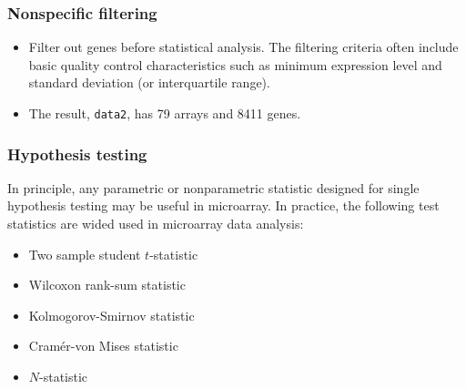 \begin{frame}[fragile]
  \frametitle{Nonspecific filtering}
  \begin{itemize}
  \item Filter out genes \alert{before} statistical analysis.  The
    filtering criteria often include basic quality control
    characteristics such as minimum expression level and standard
    deviation (or interquartile range).
\begin{knitrout}\footnotesize
{}\color{fgcolor}\begin{kframe}
\begin{alltt}
 \hlkwb{<-} \hlstd{(}\hlopt{>=}

 \hlkwb{<-} \hlstd{(}\hlopt{>=}
 \hlkwb{<-} \hlstd{data1[filter1} \hlopt{&} \hlstd{filter2, ]}
\end{alltt}
\end{kframe}
\end{knitrout}
  \item The result, \texttt{data2}, has 79 arrays and 8411 genes.
  \end{itemize}
\end{frame}


\begin{frame}
  \frametitle{Hypothesis testing} In principle, any parametric or
  nonparametric statistic designed for single hypothesis testing may
  be useful in microarray.  In practice, the following test statistics
  are wided used in microarray data analysis:
  \begin{itemize}
  \item Two sample student $t$-statistic
  \item Wilcoxon rank-sum statistic
  \item Kolmogorov-Smirnov statistic
  \item Cram\'er-von Mises statistic
  \item $N$-statistic
  \end{itemize}
\end{frame}

